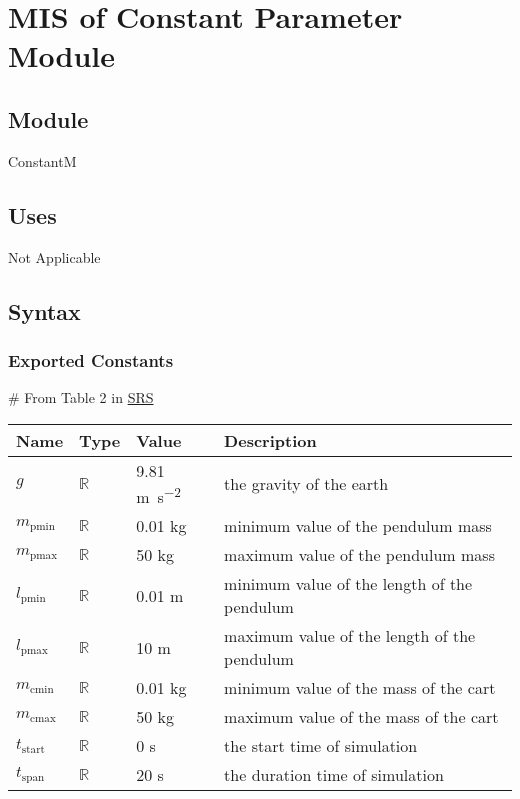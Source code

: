\documentclass[12pt, titlepage]{article}
\begin{document}
\newpage
\section{MIS of Constant Parameter Module \label{MConstant}} 


\subsection{Module}

ConstantM

\subsection{Uses}

Not Applicable
\subsection{Syntax}


\subsubsection{Exported Constants}
\# From Table 2 in \href{https://github.com/MinMah23/CAS741-Project/tree/main/docs/SRS}{SRS}
\begin{center}
\begin{tabular}{p{2cm} p{2cm} p{2 cm} p{8cm}}
\hline

\textbf{Name} & \textbf{Type} & \textbf{Value} & \textbf{Description} \\
\hline
 $g$ & $\mathbb{R}$ & 9.81 \si {\metre\per\square\second}&the gravity of the earth\\
 $m_{\text{pmin}}$&$\mathbb{R}$&0.01 \si{\kg} &minimum value of the pendulum mass\\
$ m_{\text{pmax}}$&$\mathbb{R}$& 50 \si{\kg} &maximum value of the pendulum mass\\
$ l_{\text{pmin}}$&$\mathbb{R}$&0.01 \si{\m}&minimum value of the length of the pendulum\\
$ l_{\text{pmax}}$&$\mathbb{R}$&10 \si{\m}&maximum value of the length of the pendulum\\
$ m_{\text{cmin}}$&$\mathbb{R}$& 0.01 \si{\kg} &minimum value of the mass of the cart\\
$ m_{\text{cmax}}$&$\mathbb{R}$&50 \si{\kg} &maximum value of the mass of the cart\\

$t_\text{start}$&$\mathbb{R}$&0 \si {\second}&the start time of simulation\\
$t_\text{span}$&$\mathbb{R}$&20 \si {\second}&the duration time of simulation\\
 \hline

\end{tabular}
\end{center}
\end{document}
